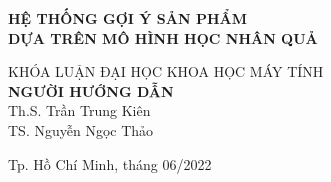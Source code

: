 \begin{titlepage}
\begin{center}

{ \Large \bfseries HỆ THỐNG GỢI Ý SẢN PHẨM \\DỰA TRÊN MÔ HÌNH HỌC NHÂN QUẢ \\[2cm]}  


\large KHÓA LUẬN ĐẠI HỌC KHOA HỌC MÁY TÍNH\\

\textbf{NGƯỜI HƯỚNG DẪN}\\
Th.S. Trần Trung Kiên\\
TS. Nguyễn Ngọc Thảo\\



\vfill
Tp. Hồ Chí Minh, tháng 06/2022

\end{center}

\end{titlepage}